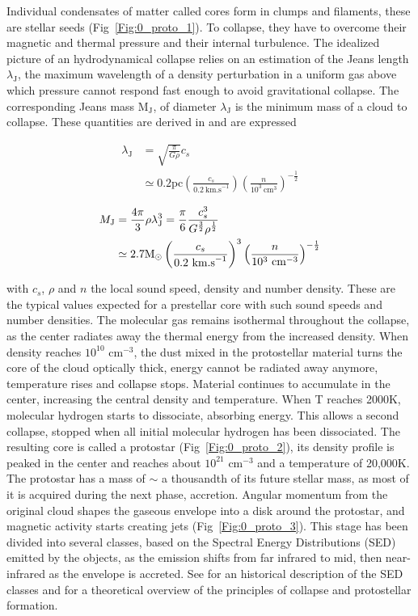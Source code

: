 Individual condensates of matter called cores form in clumps and filaments, these are stellar seeds (Fig~\ref{Fig:0_proto_1}). To collapse, they have to overcome their magnetic and thermal pressure and their internal turbulence. The idealized picture of an hydrodynamical collapse relies on an estimation of the Jeans length $\lambda_\textrm{J}$, the maximum wavelength of a density perturbation in a uniform gas above which pressure cannot respond fast enough to avoid gravitational collapse. The corresponding Jeans mass M$_\textrm{J}$, of diameter $\lambda_\textrm{J}$ is the minimum mass of a cloud to collapse. These quantities are derived in \cite{BT} and are expressed

\begin{align}
\lambda_\textrm{J} & = \sqrt{\frac{\pi}{G \rho}} c_s \\
	 & \simeq  0.2 \textrm{pc} \left( \frac{c_s}{0.2 ~ \textrm{km.s}^{-1}} \right) \left( \frac{n}{10^3 ~ \textrm{cm}^3} \right)^{-\frac{1}{2}}
\end{align}

\begin{align}
M_\textrm{J} &=  \frac{4 \pi}{3} \rho  \lambda_\textrm{J} ^3 =    \frac{\pi}{6}  \frac{c_s^3}{G^\frac{3}{2}\rho^\frac{1}{2}} \\
 & \simeq  2.7 {\textrm{M}_\odot} \left( \frac{c_s}{0.2 ~ \textrm{km.s}^{-1}} \right)^3 \left( \frac{n}{10^3 ~ \textrm{cm}^{-3}} \right)^{-\frac{1}{2}}
\end{align}

with $c_s$, $\rho$ and $n$ the local sound speed, density and number density. These are the typical values expected for a prestellar core with such sound speeds and number densities. The molecular gas remains isothermal throughout the collapse, as the center radiates away the thermal energy from the increased density. When density reaches $10^{10}$ cm$^{-3}$, the dust mixed in the protostellar material turns the core of the cloud optically thick, energy cannot be radiated away anymore, temperature rises and collapse stops. Material continues to accumulate in the center, increasing the central density and temperature. When T reaches 2000K, molecular hydrogen starts to dissociate, absorbing energy. This allows a second collapse, stopped when all initial molecular hydrogen has been dissociated. The resulting core is called a protostar (Fig~\ref{Fig:0_proto_2}), its density profile is peaked in the center and reaches about $10^{21}$ cm$^{-3}$ and a temperature of 20,000K. The protostar has a mass of $\sim$ a thousandth of its future stellar mass, as most of it is acquired during the next phase, accretion. Angular momentum from the original cloud shapes the gaseous envelope into a disk around the protostar, and magnetic activity starts creating jets (Fig~\ref{Fig:0_proto_3}). This stage has been divided into several classes, based on the Spectral Energy Distributions (SED) emitted by the objects, as the emission shifts from far infrared to mid, then near-infrared as the envelope is accreted. See \cite{Evans2009} for an historical description of the SED classes and \cite{Larson1969} for a theoretical overview of the principles of collapse and protostellar formation. 



